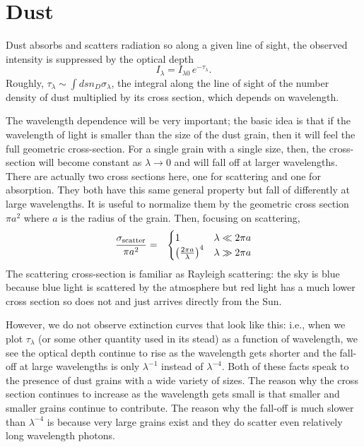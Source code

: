 \documentclass[prd,amsmath,aps,floats,amssymb, floatfix,
  superscriptaddress,nofootinbib]{revtex4-1}
\newcommand{\eql}[1]{\label{eq:#1}}
\def\vs{\nonumber\\}
\numberwithin{equation}{section}
\newcommand\be{\begin{equation}}
\newcommand\ee{\end{equation}}
\def\bea{\begin{eqnarray}}
\def\eea{\end{eqnarray}}
\begin{document}
 
 
\section{Dust} 
 
 Dust absorbs and scatters radiation so along a given line of sight, the observed intensity is suppressed by the optical depth
 \be
 I_\lambda = I_{\lambda 0}\,e^{-\tau_\lambda}
 .\eql{dtau}\ee
 Roughly, $\tau_\lambda\sim \int ds n_D\sigma_\lambda$, the integral along the line of sight of the number density of dust multiplied by its cross section, which depends on wavelength. 
 
 The wavelength dependence will be very important; the basic idea is that if the wavelength of light is smaller than the size of the dust grain, then it will feel the full geometric cross-section. For a single grain with a single size, then, the cross-section will become constant as $\lambda\rightarrow 0$ and will fall off at larger wavelengths. There are actually two cross sections here, one for scattering and one for absorption. They both have this same general property but fall of differently at large wavelengths. It is useful to normalize them by the geometric cross section $\pi a^2$ where $a$ is the radius of the grain. Then, focusing on scattering,
 \bea
 \frac{\sigma_{\rm scatter}}{\pi a^2} &=& \begin{cases}
 1 & \lambda \ll 2\pi a\cr
\left( \frac{2\pi a}{\lambda}  \right)^4  & \lambda \gg 2\pi a\cr
\end{cases}
\eql{dusts}\eea
The scattering cross-section is familiar as Rayleigh scattering: the sky is blue because blue light is scattered by the atmosphere but red light has a much lower cross section so does not and just arrives directly from the Sun.  				
 
 
 
 However, we do not observe extinction curves that look like this: i.e., when we plot $\tau_\lambda$ (or some other quantity used in its stead) as a function of wavelength, we see the optical depth continue to rise as the wavelength gets shorter and the fall-off at large wavelengths is only $\lambda^{-1}$ instead of $\lambda^{-4}$. Both of these facts speak to the presence of dust grains with a wide variety of sizes. The reason why the cross section continues to increase as the wavelength gets small is that smaller and smaller grains continue to contribute. The reason why the fall-off is much slower than $\lambda^{-4}$ is because very large grains exist and they do scatter even relatively long wavelength photons. 
 
\end{document}

